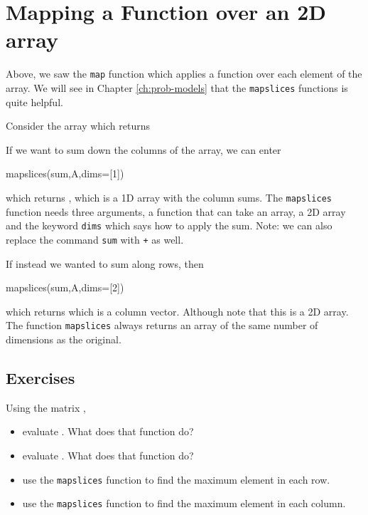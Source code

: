 \section{Mapping a Function over an 2D array}

Above, we saw the \verb!map! function which applies a function over each element of the array.  We will see in Chapter \ref{ch:prob-models} that the \verb!mapslices! functions is quite helpful. 

Consider the array  which returns
 \printpythontex[verbatim]
 
If we want to sum down the columns of the array, we can enter 
\begin{jlblock}[fp]
mapslices(sum,A,dims=[1])
\end{jlblock}
which returns  \printpythontex[verb], which is a 1D array with the column sums.  The \verb!mapslices! function needs three arguments, a function that can take an array, a 2D array and the keyword \texttt{dims} which says how to apply the sum.  Note: we can also replace the command \verb!sum! with \verb!+! as well.   

If instead we wanted to sum along rows, then 
\begin{jlblock}[fp]
mapslices(sum,A,dims=[2])
\end{jlblock}
which returns  \printpythontex[verbatim] which is a column vector. Although note that this is a 2D array.  The function \texttt{mapslices} always returns an array of the same number of dimensions as the original.  

\subsection{Exercises}

Using the matrix , 
\begin{itemize}
\item evaluate .  What does that function do?
\item evaluate .  What does that function do?
\item use the \verb!mapslices! function to find the maximum element in each row.  
\item use the \verb!mapslices! function to find the maximum element in each column.  
\end{itemize}




